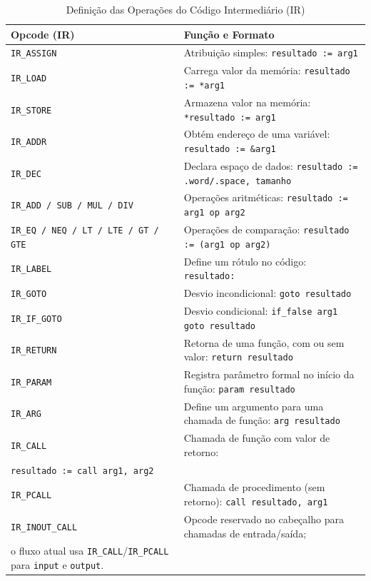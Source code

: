 \documentclass[
	12pt,				%
	oneside,
	a4paper,			%
	english,			%
	french,				%
	spanish,			%
	brazil,				%
	]{abntex2}
\begin{document}
\begin{table}[H]
    \centering
    \ABNTEXfontereduzida
    \caption{Definição das Operações do Código Intermediário (IR)}
    \label{tab:ir_opcodes}
    \begin{tabular}{|l|l|}
        \hline
        \textbf{Opcode (IR)} & \textbf{Função e Formato} \\
        \hline \hline
        \texttt{IR\_ASSIGN} & Atribuição simples: \texttt{resultado := arg1} \\
        \hline
        \texttt{IR\_LOAD} & Carrega valor da memória: \texttt{resultado := *arg1} \\
        \hline
        \texttt{IR\_STORE} & Armazena valor na memória: \texttt{*resultado := arg1} \\
        \hline
        \texttt{IR\_ADDR} & Obtém endereço de uma variável: \texttt{resultado := \&arg1} \\
        \hline
        \texttt{IR\_DEC} & Declara espaço de dados: \texttt{resultado := .word/.space, tamanho} \\
        \hline
        \texttt{IR\_ADD / SUB / MUL / DIV} & Operações aritméticas: \texttt{resultado := arg1 op arg2} \\
        \hline
        \texttt{IR\_EQ / NEQ / LT / LTE / GT / GTE} & Operações de comparação: \texttt{resultado := (arg1 op arg2)} \\
        \hline
        \texttt{IR\_LABEL} & Define um rótulo no código: \texttt{resultado:} \\
        \hline
        \texttt{IR\_GOTO} & Desvio incondicional: \texttt{goto resultado} \\
        \hline
        \texttt{IR\_IF\_GOTO} & Desvio condicional: \texttt{if\_false arg1 goto resultado} \\
        \hline
        \texttt{IR\_RETURN} & Retorna de uma função, com ou sem valor: \texttt{return resultado} \\
        \hline
        \texttt{IR\_PARAM} & Registra parâmetro formal no início da função: \texttt{param resultado} \\
        \hline
        \texttt{IR\_ARG} & Define um argumento para uma chamada de função: \texttt{arg resultado} \\
        \hline
        \texttt{IR\_CALL} & Chamada de função com valor de retorno: \\ \texttt{resultado := call arg1, arg2} \\
        \hline
        \texttt{IR\_PCALL} & Chamada de procedimento (sem retorno): \texttt{call resultado, arg1} \\
        \hline
        \texttt{IR\_INOUT\_CALL} & Opcode reservado no cabeçalho para chamadas de entrada/saída; \\
        o fluxo atual usa \texttt{IR\_CALL}/\texttt{IR\_PCALL} para \texttt{input} e \texttt{output}. \\
        \hline
    \end{tabular}
\end{table}
\end{document}
